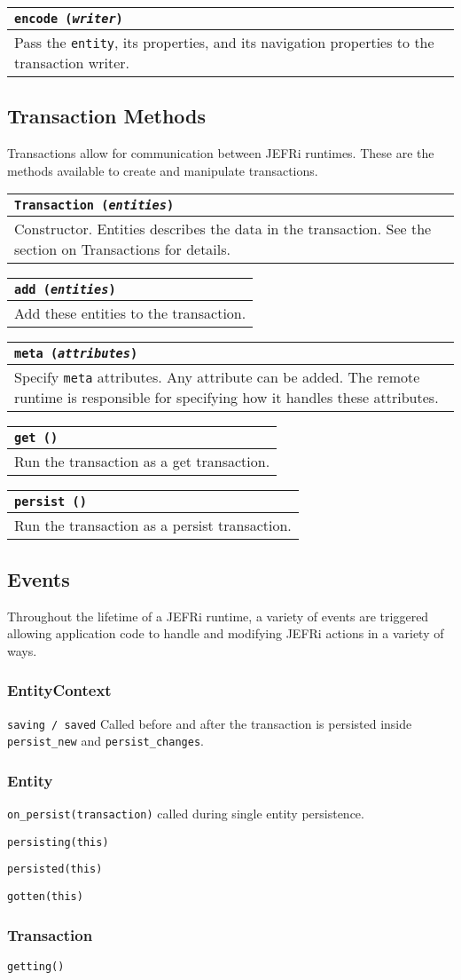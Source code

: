 \documentclass{article}
\newcommand{\ilcode}{\tt}
\newcommand{\method}[4]{
	\begin{tabular}{ | l | p{5in} | }
	\hline
	\multicolumn{2}{|l|}{\ilcode #1 ({\it #2})} \\
	\hline
	\multicolumn{2}{|p{6in}|}{#3} \\
	\hline
	#4
	\end{tabular}
}
\begin{document}
\method{encode}{writer}
	{Pass the {\ilcode entity}, its properties, and its navigation properties to the
			transaction writer.}{}

\subsection{Transaction Methods}
Transactions allow for communication between JEFRi runtimes. These are the methods
available to create and manipulate transactions.

\method{Transaction}{entities}
	{Constructor. Entities describes the data in the transaction. See the
			section on Transactions for details.}{}

\method{add}{entities}
	{Add these entities to the transaction.}{}

\method{meta}{attributes}
	{Specify {\ilcode meta} attributes. Any attribute can be added. The remote runtime is
	responsible for specifying how it handles these attributes.}{}

\method{get}{}
	{Run the transaction as a get transaction.}{}

\method{persist}{}
	{Run the transaction as a persist transaction.}{}

\subsection{Events}
Throughout the lifetime of a JEFRi runtime, a variety of events are triggered allowing
application code to handle and modifying JEFRi actions in a variety of ways.

\subsubsection{EntityContext}
{\ilcode saving / saved} Called before and after the transaction is persisted inside
{\ilcode persist\_new} and {\ilcode persist\_changes}.

\subsubsection{Entity}
{\ilcode on\_persist(transaction)} called during single entity persistence.

{\ilcode persisting(this)}

{\ilcode persisted(this)}

{\ilcode gotten(this)}

\subsubsection{Transaction}
{\ilcode getting()}
\end{document}
